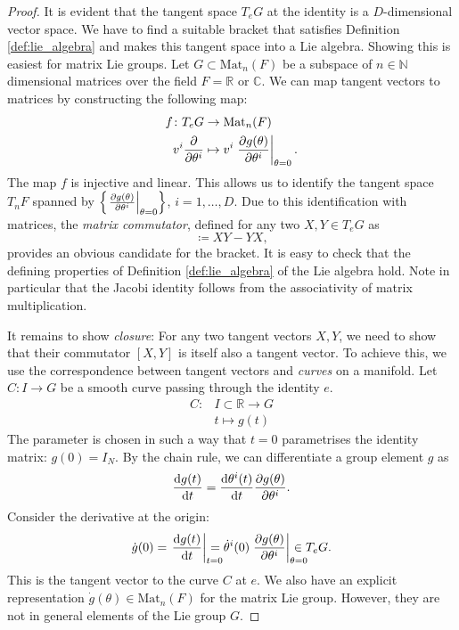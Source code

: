\begin{proof}
  It is evident that the tangent space $T_e G$ at the identity is a $D$-dimensional vector space. 
  We have to find a suitable bracket that satisfies Definition \ref{def:lie_algebra} and makes this tangent space into a Lie algebra.
  Showing this is easiest for matrix Lie groups.
  Let $G \subset \text{Mat}_n (F)$ be a subspace of $n \in \mathbb{N}$ dimensional matrices over the field $F = \mathbb{R}$ or $\mathbb{C}$.
  We can map tangent vectors to matrices by constructing the following map:
  \begin{equation}
    \begin{split}
      f \colon T_e G &\to \text{Mat}_n(F) \\
      v^i \pdv{}{\theta^i} &\mapsto v^i \left.\pdv{g(\theta)}{\theta^i} \right\lvert_{\theta = 0}.
    \end{split}
  \end{equation}
  The map $f$ is injective and linear.
  This allows us to identify the tangent space $T_n F$ spanned by $ \left\{ \left. \pdv{g(\theta)}{\theta^i}\right\rvert_{\theta = 0}\right\}$, $i = 1, \ldots, D$.
  Due to this identification with matrices, the \emph{matrix commutator}, defined for any two $X, Y \in T_e G$ as
  \begin{equation}
    [X, Y] \coloneqq XY - YX,
  \end{equation}
  provides an obvious candidate for the bracket.
  It is easy to check that the defining properties of Definition \ref{def:lie_algebra} of the Lie algebra hold.
  Note in particular that the Jacobi identity follows from the associativity of matrix multiplication.
  
  It remains to show \emph{closure}: For any two tangent vectors $X, Y$, we need to show that their commutator $[X, Y]$ is itself also a tangent vector.
  To achieve this, we use the correspondence between tangent vectors and \emph{curves} on a manifold.
  Let $C: I \to G$ be a smooth curve passing through the identity $e$.
  \begin{equation}
    \begin{split}
      C \colon &I \subset \mathbb{R} \to G \\
       &t \mapsto g(t)
    \end{split}
  \end{equation}
  The parameter is chosen in such a way that $t=0$ parametrises the identity matrix: $g(0) = I_N$.
  By the chain rule, we can differentiate a group element $g$ as
  \begin{equation}
    \dv{g(t)}{t} = \dv{\theta^i (t)}{t} \pdv{g(\theta)}{\theta^i}.
  \end{equation}
  Consider the derivative at the origin:
  \begin{equation}
    \dot g(0) = \left. \dv{g(t)}{t}\right\rvert_{\mathrlap{t=0}} = \dot \theta^i(0) \left.\pdv{g(\theta)}{\theta^i}\right\rvert_{\mathrlap{\theta = 0}} \in T_e  G.
  \end{equation}
  This is the tangent vector to the curve $C$ at $e$.
  We also have an explicit representation $\dot g(\theta) \in \text{Mat}_n (F)$ for the matrix Lie group. However, they are not in general elements of the Lie group $G$.


\end{proof}

